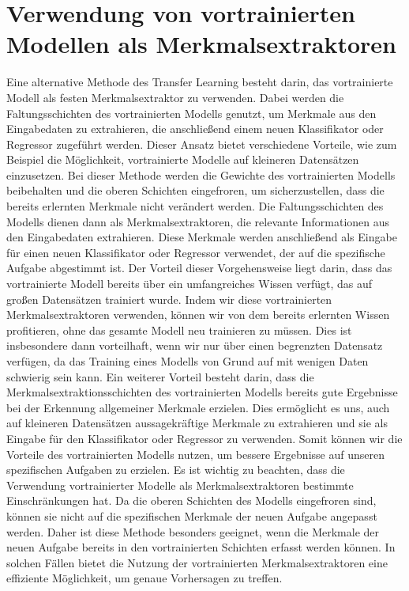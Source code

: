 \section{Verwendung von vortrainierten Modellen als Merkmalsextraktoren}

    Eine alternative Methode des Transfer Learning besteht darin, das vortrainierte Modell als festen Merkmalsextraktor zu verwenden. 
    Dabei werden die Faltungsschichten des vortrainierten Modells genutzt, um Merkmale aus den Eingabedaten zu extrahieren, die anschließend einem neuen Klassifikator oder Regressor zugeführt werden. 
    Dieser Ansatz bietet verschiedene Vorteile, wie zum Beispiel die Möglichkeit, vortrainierte Modelle auf kleineren Datensätzen einzusetzen.
    Bei dieser Methode werden die Gewichte des vortrainierten Modells beibehalten und die oberen Schichten eingefroren, um sicherzustellen, dass die bereits erlernten Merkmale nicht verändert werden. 
    Die Faltungsschichten des Modells dienen dann als Merkmalsextraktoren, die relevante Informationen aus den Eingabedaten extrahieren. 
    Diese Merkmale werden anschließend als Eingabe für einen neuen Klassifikator oder Regressor verwendet, der auf die spezifische Aufgabe abgestimmt ist.
    Der Vorteil dieser Vorgehensweise liegt darin, dass das vortrainierte Modell bereits über ein umfangreiches Wissen verfügt, das auf großen Datensätzen trainiert wurde. 
    Indem wir diese vortrainierten Merkmalsextraktoren verwenden, können wir von dem bereits erlernten Wissen profitieren, ohne das gesamte Modell neu trainieren zu müssen. 
    Dies ist insbesondere dann vorteilhaft, wenn wir nur über einen begrenzten Datensatz verfügen, da das Training eines Modells von Grund auf mit wenigen Daten schwierig sein kann.
    Ein weiterer Vorteil besteht darin, dass die Merkmalsextraktionsschichten des vortrainierten Modells bereits gute Ergebnisse bei der Erkennung allgemeiner Merkmale erzielen. 
    Dies ermöglicht es uns, auch auf kleineren Datensätzen aussagekräftige Merkmale zu extrahieren und sie als Eingabe für den Klassifikator oder Regressor zu verwenden. 
    Somit können wir die Vorteile des vortrainierten Modells nutzen, um bessere Ergebnisse auf unseren spezifischen Aufgaben zu erzielen.
    Es ist wichtig zu beachten, dass die Verwendung vortrainierter Modelle als Merkmalsextraktoren bestimmte Einschränkungen hat. 
    Da die oberen Schichten des Modells eingefroren sind, können sie nicht auf die spezifischen Merkmale der neuen Aufgabe angepasst werden. 
    Daher ist diese Methode besonders geeignet, wenn die Merkmale der neuen Aufgabe bereits in den vortrainierten Schichten erfasst werden können. 
    In solchen Fällen bietet die Nutzung der vortrainierten Merkmalsextraktoren eine effiziente Möglichkeit, um genaue Vorhersagen zu treffen.

